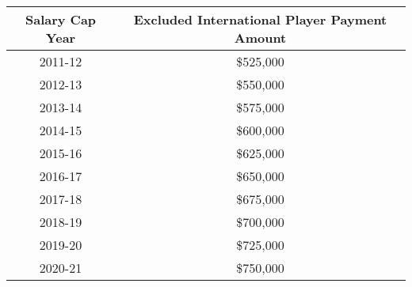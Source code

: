 \documentclass[
]{book}
\begin{document}
\begin{enumerate}
  \begin{longtable}[]{@{}cc@{}}
  \toprule()
  Salary Cap Year & Excluded International Player Payment Amount \\
  \midrule()
  \endhead
  2011-12 & \$525,000 \\
  2012-13 & \$550,000 \\
  2013-14 & \$575,000 \\
  2014-15 & \$600,000 \\
  2015-16 & \$625,000 \\
  2016-17 & \$650,000 \\
  2017-18 & \$675,000 \\
  2018-19 & \$700,000 \\
  2019-20 & \$725,000 \\
  2020-21 & \$750,000 \\
  \bottomrule()
  \end{longtable}


\end{enumerate}
\end{document}
